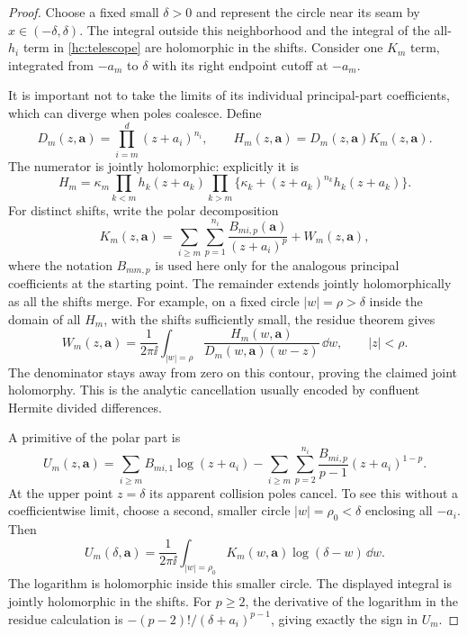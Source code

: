 \begin{proof}
Choose a fixed small $\delta>0$ and represent the circle near its seam
by $x\in(-\delta,\delta)$. The integral outside this neighborhood and
the integral of the all-$h_i$ term in \eqref{hc:telescope} are
holomorphic in the shifts. Consider one $K_m$ term, integrated from
$-a_m$ to $\delta$ with its right endpoint cutoff at $-a_m$.

It is important not to take the limits of its individual principal-part
coefficients, which can diverge when poles coalesce. Define
\[
 D_m(z,\boldsymbol a)=\prod_{i=m}^d(z+a_i)^{n_i},\qquad
 H_m(z,\boldsymbol a)=D_m(z,\boldsymbol a)K_m(z,\boldsymbol a).
\]
The numerator is jointly holomorphic: explicitly it is
\[
 H_m=\kappa_m\prod_{k<m}h_k(z+a_k)
       \prod_{k>m}\bigl\{\kappa_k+(z+a_k)^{n_k}h_k(z+a_k)\bigr\}.
\]
For distinct shifts, write the polar decomposition
\[
 K_m(z,\boldsymbol a)
   =\sum_{i\ge m}\sum_{p=1}^{n_i}
          \frac{B_{mi,p}(\boldsymbol a)}{(z+a_i)^p}
       +W_m(z,\boldsymbol a),
\]
where the notation $B_{mm,p}$ is used here only for the analogous
principal coefficients at the starting point.
The remainder extends jointly holomorphically as all the shifts merge.
For example, on a fixed circle $|w|=\rho>\delta$ inside the domain of
all $H_m$, with the shifts sufficiently small, the residue theorem gives
\begin{equation}\label{hc:Hermite}
 W_m(z,\boldsymbol a)=\frac1{2\pi\ii}
 \int_{|w|=\rho}\frac{H_m(w,\boldsymbol a)}
  {D_m(w,\boldsymbol a)(w-z)}\,\dd w,\qquad |z|<\rho.
\end{equation}
The denominator stays away from zero on this contour, proving the
claimed joint holomorphy. This is the analytic cancellation usually
encoded by confluent Hermite divided differences.

A primitive of the polar part is
\[
 U_m(z,\boldsymbol a)=
 \sum_{i\ge m} B_{mi,1}\log(z+a_i)
 -\sum_{i\ge m}\sum_{p=2}^{n_i}
       \frac{B_{mi,p}}{p-1}(z+a_i)^{1-p}.
\]
At the upper point $z=\delta$ its apparent collision poles cancel.
To see this without a coefficientwise limit, choose a second, smaller
circle $|w|=\rho_0<\delta$ enclosing all $-a_i$. Then
\begin{equation}\label{hc:upper}
 U_m(\delta,\boldsymbol a)=\frac1{2\pi\ii}
  \int_{|w|=\rho_0}K_m(w,\boldsymbol a)
                         \log(\delta-w)\,\dd w.
\end{equation}
The logarithm is holomorphic inside this smaller circle. The displayed
integral is jointly holomorphic in the shifts. For $p\ge2$, the derivative
of the logarithm in the residue calculation is
$-(p-2)!/(\delta+a_i)^{p-1}$, giving exactly the sign in $U_m$.


\end{proof}
